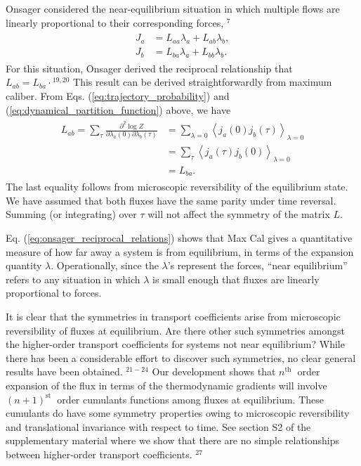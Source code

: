 \documentclass[aps,pra,twocolumn]{revtex4-1}
\begin{document}
Onsager considered the near-equilibrium situation in which multiple flows are linearly proportional to their corresponding forces, ${ }^7$
\begin{eqnarray}
\begin{aligned}
J_a & =L_{a a} \lambda_a+L_{a b} \lambda_b, \\
J_b & =L_{b a} \lambda_a+L_{b b} \lambda_b.
\end{aligned}
\end{eqnarray}
For this situation, Onsager derived the reciprocal relationship that $L_{a b}=L_{b a} \cdot{ }^{19,20}$ This result can be derived straightforwardly from maximum caliber. From Eqs. (\ref{eq:trajectory_probability}) and (\ref{eq:dynamical_partition_function}) above, we have
\begin{eqnarray}
\begin{aligned}
L_{a b}=\sum_\tau \frac{\partial^2 \log Z}{\partial \lambda_a(0) \partial \lambda_b(\tau)} & =\sum_{\lambda=0}\left\langle j_a(0) j_b(\tau)\right\rangle_{\lambda=0} \nonumber\\
& =\sum_\tau\left\langle j_a(\tau) j_b(0)\right\rangle_{\lambda=0} \nonumber\\
& =L_{b a}. \label{eq:onsager_reciprocal_relations}
\end{aligned}
\end{eqnarray}
The last equality follows from microscopic reversibility of the equilibrium state. We have assumed that both fluxes have the same parity under time reversal. Summing (or integrating) over $\tau$ will not affect the symmetry of the matrix $L$.

Eq. (\ref{eq:onsager_reciprocal_relations}) shows that Max Cal gives a quantitative measure of how far away a system is from equilibrium, in terms of the expansion quantity $\lambda$. Operationally, since the $\lambda$'s represent the forces, ``near equilibrium'' refers to any situation in which $\lambda$ is small enough that fluxes are linearly proportional to forces.

It is clear that the symmetries in transport coefficients arise from microscopic reversibility of fluxes at equilibrium. Are there other such symmetries amongst the higher-order transport coefficients for systems not near equilibrium? While there has been a considerable effort to discover such symmetries, no clear general results have been obtained. ${ }^{21-24}$ Our development shows that $n^{\text {th }}$ order expansion of the flux in terms of the thermodynamic gradients will involve $(n+1)^{\text {st }}$ order cumulants functions among fluxes at equilibrium. These cumulants do have some symmetry properties owing to microscopic reversibility and translational invariance with respect to time. See section S2 of the supplementary material where we show that there are no simple relationships between higher-order transport coefficients. ${ }^{27}$
\end{document}
